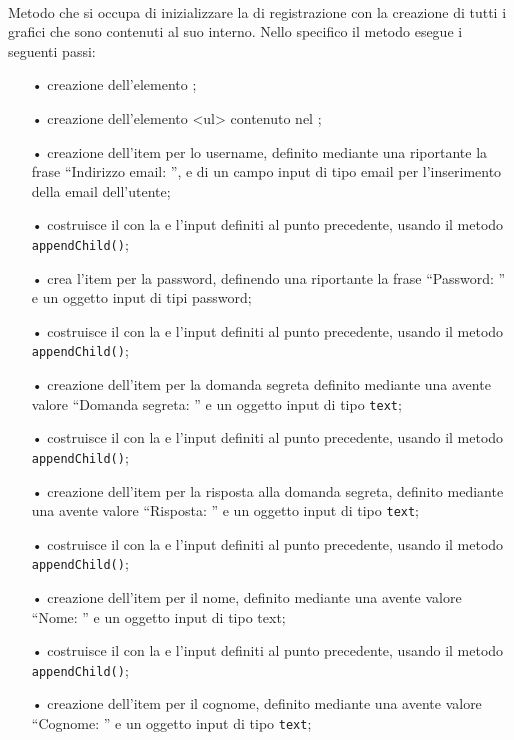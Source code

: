 \begin{description}
	\item{}\\
	Metodo che si occupa di inizializzare la  di registrazione con la creazione di tutti i  grafici che sono contenuti al suo interno. Nello specifico il metodo esegue i seguenti passi:
	\begin{itemize}
		\item[•] creazione dell'elemento ;
		\item[•] creazione dell'elemento <ul> contenuto nel ;		
		\item[•] creazione dell'item per lo username, definito mediante una  riportante la frase ``Indirizzo email: '', e di un campo input di tipo email per l'inserimento della email dell'utente;
		\item[•] costruisce il  con la  e l'input definiti al punto precedente, usando il metodo \texttt{appendChild()};
		\item[•] crea l'item per la password, definendo una  riportante la frase ``Password: '' e un oggetto input di tipi password;			
		\item[•] costruisce il  con la  e l'input definiti al punto precedente, usando il metodo \texttt{appendChild()};
		\item[•] creazione dell'item per la domanda segreta definito mediante una  avente valore ``Domanda segreta: '' e un oggetto input di tipo \texttt{text};
		\item[•] costruisce il  con la  e l'input definiti al punto precedente, usando il metodo \texttt{appendChild()};
		\item[•] creazione dell'item per la risposta alla domanda segreta, definito mediante una  avente valore ``Risposta: '' e un oggetto input di tipo \texttt{text};
		\item[•] costruisce il  con la  e l'input definiti al punto precedente, usando il metodo \texttt{appendChild()};
		\item[•] creazione dell'item per il nome, definito mediante una  avente valore ``Nome: '' e un oggetto input di tipo text;
		\item[•] costruisce il  con la  e l'input definiti al punto precedente, usando il metodo \texttt{appendChild()};
		\item[•] creazione dell'item per il cognome, definito mediante una  avente valore ``Cognome: '' e un oggetto input di tipo \texttt{text};

\end{itemize}
\end{description}

